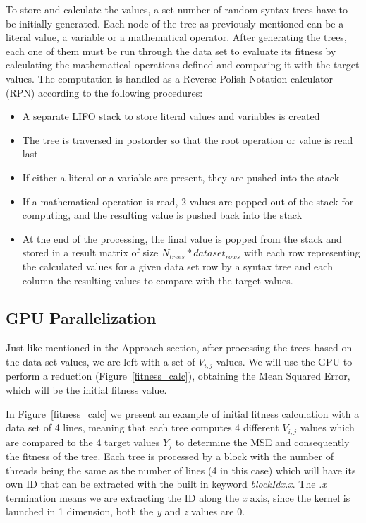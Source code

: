 \documentclass[runningheads]{llncs}
\begin{document}
To store and calculate the values, a set number of random syntax trees have to be initially generated. Each node of the tree as previously mentioned can be a literal value, a variable or a mathematical operator. After generating the trees, each one of them must be run through the data set to evaluate its fitness by calculating the mathematical operations defined and comparing it with the target values. The computation is handled as a Reverse Polish Notation calculator (RPN) according to the following procedures:
\begin{itemize}
	\item A separate LIFO stack to store literal values and variables is created
	\item The tree is traversed in postorder so that the root operation or value is read last
	\item If either a literal or a variable are present, they are pushed into the stack
	\item If a mathematical operation is read, 2 values are popped out of the stack for computing, and the resulting value is pushed back into the stack
	\item At the end of the processing, the final value is popped from the stack and stored in a result matrix of size $N_{trees}*dataset_{rows}$ with each row representing the calculated values for a given data set row by a syntax tree and each column the resulting values to compare with the target values.
\end{itemize}

\subsection{GPU Parallelization}
Just like mentioned in the Approach section, after processing the trees based on the data set values, we are left with a set of $V_{i,j}$ values. We will use the GPU to perform a reduction (Figure~\ref{fitness_calc}), obtaining the Mean Squared Error, which will be the initial fitness value.

In Figure~\ref{fitness_calc} we present an example of initial fitness calculation with a data set of 4 lines, meaning that each tree computes 4 different $V_{i,j}$ values which are compared to the 4 target values $Y_j$ to determine the MSE and consequently the fitness of the tree. Each tree is processed by a block with the number of threads being the same as the number of lines (4 in this case) which will have its own ID that can be extracted with the built in keyword \textit{blockIdx.x}. The \textit{.x} termination means we are extracting the ID along the \textit{x} axis, since the kernel is launched in 1 dimension, both the \textit{y} and \textit{z} values are 0.
\end{document}
